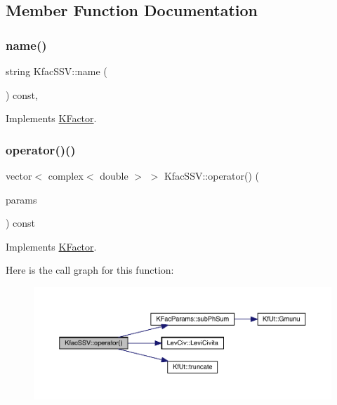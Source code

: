 \subsection{Member Function Documentation}
\mbox{\label{classKfacSSV_a72d5e577525fa97365dbcfd4c5bea88d}} 
\subsubsection{\texorpdfstring{name()}{name()}}
{\footnotesize\ttfamily string Kfac\+S\+S\+V\+::name (\begin{DoxyParamCaption}{ }\end{DoxyParamCaption}) const\hspace{0.3cm}{\ttfamily [inline]}, {\ttfamily [virtual]}}



Implements \mbox{\hyperlink{classKFactor_ae578f8d6e4b525895427717da99cab6c}{K\+Factor}}.

\mbox{\label{classKfacSSV_aeea4f3f068452d233d4111d72c05cd4f}} 
\subsubsection{\texorpdfstring{operator()()}{operator()()}}
{\footnotesize\ttfamily vector$<$ complex$<$ double $>$ $>$ Kfac\+S\+S\+V\+::operator() (\begin{DoxyParamCaption}\item[{const \mbox{\hyperlink{classKFacParams}{K\+Fac\+Params}} \&}]{params }\end{DoxyParamCaption}) const\hspace{0.3cm}{\ttfamily [virtual]}}



Implements \mbox{\hyperlink{classKFactor_a012aae9ff4a07eab86d5d50b7f774285}{K\+Factor}}.

Here is the call graph for this function\+:\nopagebreak
\begin{figure}[H]
\begin{center}
\leavevmode
\includegraphics[width=350pt]{d8/d76/classKfacSSV_aeea4f3f068452d233d4111d72c05cd4f_cgraph}
\end{center}
\end{figure}


